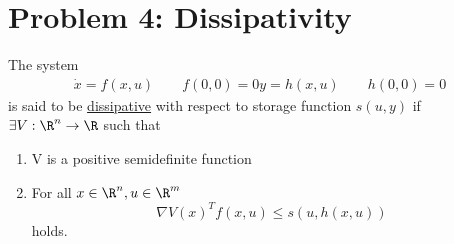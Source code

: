 \documentclass{homework}
\begin{document}
\section{Problem 4: Dissipativity}

The system
\begin{align*}
    \dot{x} = f(x, u) \qquad f(0, 0) = 0
    y = h(x, u) \qquad h(0, 0) = 0
\end{align*}
is said to be \underline{dissipative} with respect to 
storage function $s(u, y)$ if $\exists V: \R^n \to \R$
such that
\begin{enumerate}
    \item V is a positive semidefinite function
    \item For all $x \in \R^n, u \in \R^m$
    \begin{equation}
        \nabla V(x)^T f(x, u) \leq s(u, h(x, u))
        \label{eq:dissipative-prop}
    \end{equation}
        holds.
\end{enumerate}
\end{document}
